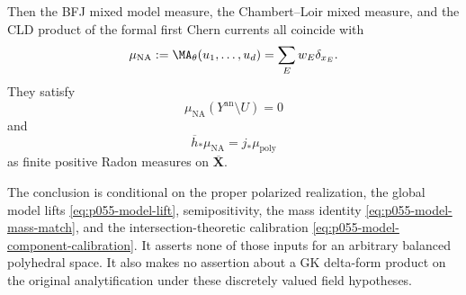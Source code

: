 \begin{proposition}
Then the BFJ mixed model measure, the Chambert--Loir mixed measure, and the
CLD product of the formal first Chern currents all coincide with
\begin{equation}
 \mu_{\mathrm{NA}}
 :=\MA_\theta(u_1,\ldots,u_d)
 =\sum_Ew_E\delta_{x_E}.
 \label{eq:p055-model-common-measures}
\end{equation}
They satisfy
\begin{equation}
 \mu_{\mathrm{NA}}(Y^{\mathrm{an}}\setminus U)=0
 \label{eq:p055-model-boundary-zero}
\end{equation}
and
\begin{equation}
 \overline h_*\mu_{\mathrm{NA}}
 =j_*\mu_{\mathrm{poly}}
 \label{eq:p055-model-global-comparison}
\end{equation}
as finite positive Radon measures on $\overline{\mathbf X}$.

The conclusion is conditional on the proper polarized realization, the
global model lifts \eqref{eq:p055-model-lift}, semipositivity, the mass
identity \eqref{eq:p055-model-mass-match}, and the intersection-theoretic
calibration \eqref{eq:p055-model-component-calibration}.  It asserts none
of those inputs for an arbitrary balanced polyhedral space.  It also makes
no assertion about a GK delta-form product on the original analytification
under these discretely valued field hypotheses.
\end{proposition}

